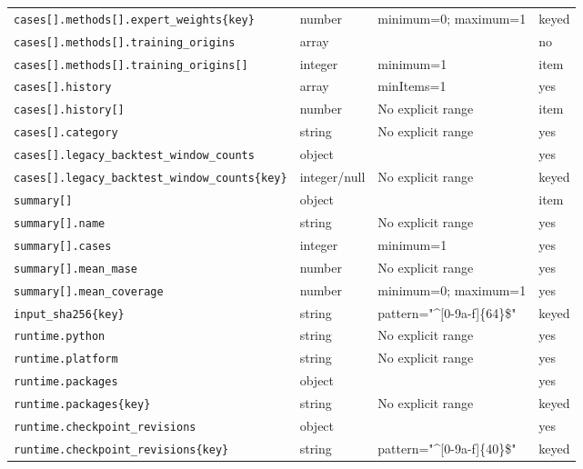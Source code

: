 \begin{longtable}{@{}p{}p{}p{}p{}@{}}
\texttt{cases[].\allowbreak{}methods[].\allowbreak{}expert\_\allowbreak{}weights\{key\}} & number & minimum=0; maximum=1 & keyed\\
\texttt{cases[].\allowbreak{}methods[].\allowbreak{}training\_\allowbreak{}origins} & array &  & no\\
\texttt{cases[].\allowbreak{}methods[].\allowbreak{}training\_\allowbreak{}origins[]} & integer & minimum=1 & item\\
\texttt{cases[].\allowbreak{}history} & array & minItems=1 & yes\\
\texttt{cases[].\allowbreak{}history[]} & number & No explicit range & item\\
\texttt{cases[].\allowbreak{}category} & string & No explicit range & yes\\
\texttt{cases[].\allowbreak{}legacy\_\allowbreak{}backtest\_\allowbreak{}window\_\allowbreak{}counts} & object &  & yes\\
\texttt{cases[].\allowbreak{}legacy\_\allowbreak{}backtest\_\allowbreak{}window\_\allowbreak{}counts\{key\}} & integer/null & No explicit range & keyed\\
\texttt{summary[]} & object &  & item\\
\texttt{summary[].\allowbreak{}name} & string & No explicit range & yes\\
\texttt{summary[].\allowbreak{}cases} & integer & minimum=1 & yes\\
\texttt{summary[].\allowbreak{}mean\_\allowbreak{}mase} & number & No explicit range & yes\\
\texttt{summary[].\allowbreak{}mean\_\allowbreak{}coverage} & number & minimum=0; maximum=1 & yes\\
\texttt{input\_\allowbreak{}sha256\{key\}} & string & pattern="\textasciicircum{}[0-9a-f]\{64\}\$" & keyed\\
\texttt{runtime.\allowbreak{}python} & string & No explicit range & yes\\
\texttt{runtime.\allowbreak{}platform} & string & No explicit range & yes\\
\texttt{runtime.\allowbreak{}packages} & object &  & yes\\
\texttt{runtime.\allowbreak{}packages\{key\}} & string & No explicit range & keyed\\
\texttt{runtime.\allowbreak{}checkpoint\_\allowbreak{}revisions} & object &  & yes\\
\texttt{runtime.\allowbreak{}checkpoint\_\allowbreak{}revisions\{key\}} & string & pattern="\textasciicircum{}[0-9a-f]\{40\}\$" & keyed\\

\end{longtable}
